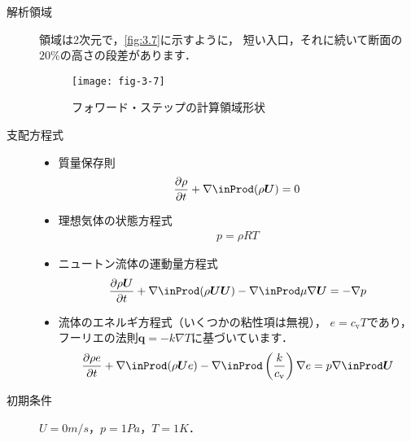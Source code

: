 \begin{description}
 \item[解析領域] 領域は2次元で，\autoref{fig:3.7}に示すように，
            短い入口，それに続いて断面の$20\unit{\%}$の高さの段差があります．


\begin{figure}[ht]
 \texttt{[image: fig-3-7]}
 \caption{フォワード・ステップの計算領域形状}
 \label{fig:3.7}
\end{figure}


 \item[支配方程式] \mbox{}
            \begin{itemize}
             \item 質量保存則
                   \begin{align}
                    \label{eq:3.8}
                    \frac{\partial\rho}{\partial t}
                    + \nabla \inProd (\rho\bm{U}) = 0
                   \end{align}
             \item 理想気体の状態方程式
                   \begin{align}
                    \label{eq:3.9}
                    p = \rho RT
                   \end{align}
             \item ニュートン流体の運動量方程式
                   \begin{align}
                    \label{eq:3.10}
                    \frac{\partial\rho\bm{U}}{\partial t}
                    + \nabla \inProd (\rho\bm{U}\bm{U})
                    - \nabla \inProd \mu\nabla\bm{U}
                    = -\nabla p
                   \end{align}
             \item 流体のエネルギ方程式（いくつかの粘性項は無視），
                   $e = c_{\mathrm{v}}T$であり，
                   フーリエの法則$\bm{q} = -k\nabla T$に基づいています．
                   \begin{align}
                    \label{eq:3.11}
                    \frac{\partial\rho e}{\partial t}
                    + \nabla \inProd (\rho\bm{U}e)
                    - \nabla \inProd \left(\frac{k}{c_{\mathrm{v}}}\right)\nabla e
                    = p\nabla \inProd \bm{U}
                   \end{align}
            \end{itemize}
 \item[初期条件] $U = 0 \unit{m/s}$，$p = 1 \unit{Pa}$，$T = 1 \unit{K}$．

\end{description}
